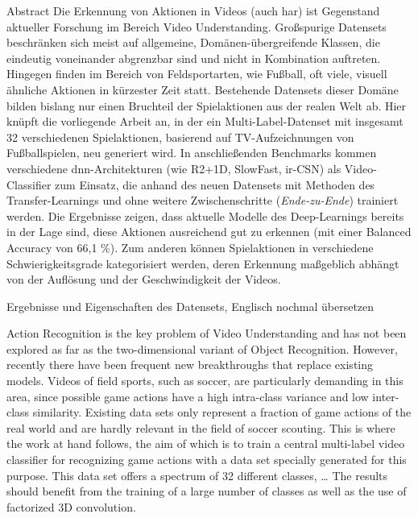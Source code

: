 \newcommand{\primarymetric}{66,1 \%}

\begin{prefacesection}{Abstract}
    Die Erkennung von Aktionen in Videos (auch \gls{har}) ist Gegenstand aktueller Forschung im Bereich Video Understanding.
    Großspurige Datensets beschränken sich meist auf allgemeine, Domänen-übergreifende Klassen, die eindeutig voneinander abgrenzbar sind und nicht in Kombination auftreten.
    Hingegen finden im Bereich von Feldsportarten, wie Fußball, oft viele, visuell ähnliche Aktionen in kürzester Zeit statt.
    Bestehende Datensets dieser Domäne bilden bislang nur einen Bruchteil der Spielaktionen aus der realen Welt ab.
    Hier knüpft die vorliegende Arbeit an, in der ein Multi-Label-Datenset mit insgesamt 32 verschiedenen Spielaktionen, basierend auf TV-Aufzeichnungen von Fußballspielen, neu generiert wird.
    In anschließenden Benchmarks kommen verschiedene \gls{dnn}-Architekturen (wie R2+1D, SlowFast, ir-CSN) als Video-Classifier zum Einsatz, die anhand des neuen Datensets mit Methoden des Transfer-Learnings und ohne weitere Zwischenschritte (\emph{Ende-zu-Ende}) trainiert werden.
    Die Ergebnisse zeigen, dass aktuelle Modelle des Deep-Learnings bereits in der Lage sind, diese Aktionen ausreichend gut zu erkennen (mit einer Balanced Accuracy von \primarymetric).
    Zum anderen können Spielaktionen in verschiedene Schwierigkeitsgrade kategorisiert werden, deren Erkennung maßgeblich abhängt von der Auflösung und der Geschwindigkeit der Videos.

    \begin{tcolorbox}[title=Todo]
        Ergebnisse und Eigenschaften des Datensets, Englisch nochmal übersetzen
    \end{tcolorbox}


    Action Recognition is the key problem of Video Understanding and has not been explored as far as the two-dimensional variant of Object Recognition.
    However, recently there have been frequent new breakthroughs that replace existing models.
    Videos of field sports, such as soccer, are particularly demanding in this area, since possible game actions have a high intra-class variance and low inter-class similarity.
    Existing data sets only represent a fraction of game actions of the real world and are hardly relevant in the field of soccer scouting.
    This is where the work at hand follows, the aim of which is to train a central multi-label video classifier for recognizing game actions with a data set specially generated for this purpose.
    This data set offers a spectrum of 32 different classes, \dots
    The results should benefit from the training of a large number of classes as well as the use of factorized 3D convolution.

\end{prefacesection}